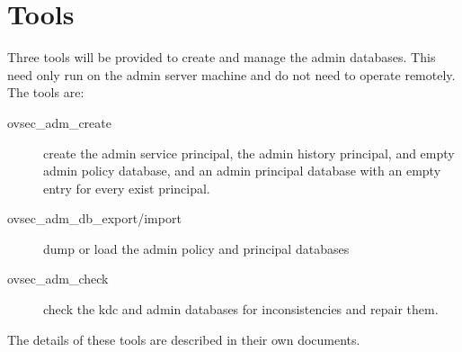 \section{Tools}

Three tools will be provided to create and manage the admin databases.
This need only run on the admin server machine and do not need to
operate remotely.  The tools are:

\begin{description}
\item[ovsec_adm_create] create the admin service principal, the admin
history principal, and empty admin policy database, and an admin
principal database with an empty entry for every exist principal.
\item[ovsec_adm_db_export/import] dump or load the admin policy and
principal databases
\item[ovsec_adm_check] check the kdc and admin databases for
inconsistencies and repair them.
\end{description}

The details of these tools are described in their own documents.


